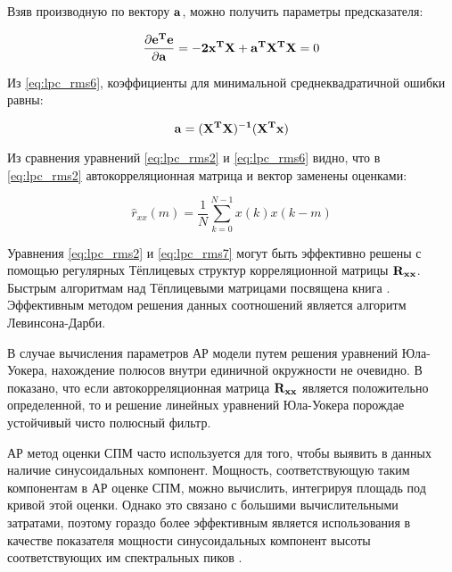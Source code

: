Взяв производную по вектору ${{\bf a}}$, можно получить параметры предсказателя:
\begin{center}
\begin{equation}
	\label{eq:lpc_rms5}
	\frac{\partial {\bf e^T e}}{\partial {\bf a}} = {\bf - 2x^T X + a^T X^T X} = 0
\end{equation}
\end{center}
Из \ref{eq:lpc_rms6}, коэффициенты для минимальной среднеквадратичной ошибки равны:
\begin{center}
\begin{equation}
	\label{eq:lpc_rms6}
	{\bf a= (X^T X)^{-1} (X^T x)}
\end{equation}
\end{center}

Из сравнения уравнений \ref{eq:lpc_rms2} и \ref{eq:lpc_rms6} видно, что в \ref{eq:lpc_rms2}
автокорреляционная матрица и вектор заменены оценками:
\begin{center}
\begin{equation}
	\label{eq:lpc_rms7}
	\hat{r}_{xx}(m) = \frac{1}{N} \sum \limits_{k=0}^{N-1} x(k)x(k-m)
\end{equation}
\end{center}

Уравнения \ref{eq:lpc_rms2} и \ref{eq:lpc_rms7} могут быть эффективно решены с помощью регулярных
Тёплицевых структур корреляционной матрицы ${{\bf R_{xx}}}$. Быстрым алгоритмам над Тёплицевыми
матрицами посвящена книга \cite{bleyhut_book}.  Эффективным методом решения
данных соотношений является алгоритм Левинсона-Дарби.

В случае вычисления параметров АР модели путем решения уравнений Юла-Уокера, нахождение полюсов
внутри единичной окружности не очевидно. В \cite{shahtarin-spectrum-book} показано, что если
автокорреляционная матрица  ${{\bf R_{xx}}}$ является положительно определенной, то и решение
линейных уравнений Юла-Уокера порождае устойчивый чисто полюсный фильтр.

АР метод оценки СПМ часто используется для того, чтобы выявить в данных наличие синусоидальных
компонент. Мощность, соответствующую  таким компонентам в АР оценке СПМ, можно вычислить, интегрируя
площадь под кривой этой оценки. Однако это связано с большими вычислительными затратами, поэтому
гораздо более эффективным является использования в качестве показателя мощности синусоидальных
компонент высоты соответствующих им спектральных пиков \cite{marpl_book}.  

